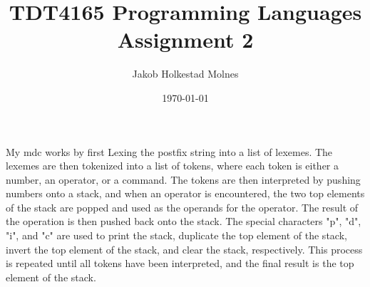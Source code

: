 \documentclass[11pt,a4paper]{report}
\title{TDT4165 Programming Languages Assignment 2}
\author{Jakob Holkestad Molnes}
\date{\today}
\begin{document}
\maketitle

\section{}
My mdc works by first Lexing the postfix string into a list of lexemes. The lexemes are then tokenized into a list of tokens, where each token is either a number, an operator, or a command. The tokens are then interpreted by pushing numbers onto a stack, and when an operator is encountered, the two top elements of the stack are popped and used as the operands for the operator. The result of the operation is then pushed back onto the stack. The special characters "p", "d", "i", and "c" are used to print the stack, duplicate the top element of the stack, invert the top element of the stack, and clear the stack, respectively. This process is repeated until all tokens have been interpreted, and the final result is the top element of the stack.
\end{document}
